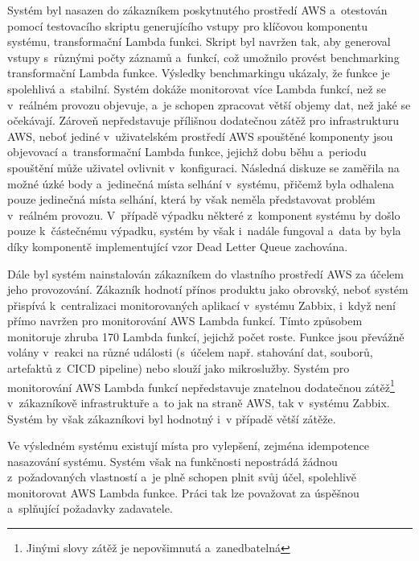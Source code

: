 \documentclass[czech, ing, kiv, he, iso690]{fasthesis}
\begin{document}
Systém byl nasazen do zákazníkem poskytnutého prostředí AWS a~otestován pomocí testovacího skriptu generujícího vstupy pro klíčovou komponentu systému, transformační Lambda funkci. Skript byl navržen tak, aby generoval vstupy s~různými počty záznamů a~funkcí, což umožnilo provést benchmarking transformační Lambda funkce. Výsledky benchmarkingu ukázaly, že funkce je spolehlivá a~stabilní. Systém dokáže monitorovat více Lambda funkcí, než se v~reálném provozu objevuje, a~je schopen zpracovat větší objemy dat, než jaké se očekávají. Zároveň nepředstavuje přílišnou dodatečnou zátěž pro infrastrukturu AWS, neboť jediné v~uživatelském prostředí AWS spouštěné komponenty jsou objevovací a~transformační Lambda funkce, jejichž dobu běhu a~periodu spouštění může uživatel ovlivnit v~konfiguraci. Následná diskuze se zaměřila na možné úzké body a~jedinečná místa selhání v~systému, přičemž byla odhalena pouze jedinečná místa selhání, která by však neměla představovat problém v~reálném provozu. V~případě výpadku některé z~komponent systému by došlo pouze k~částečnému výpadku, systém by však i~nadále fungoval a~data by byla díky komponentě implementující vzor Dead Letter Queue zachována.

Dále byl systém nainstalován zákazníkem do vlastního prostředí AWS za účelem jeho provozování. Zákazník hodnotí přínos produktu jako obrovský, neboť systém přispívá k~centralizaci monitorovaných aplikací v~systému Zabbix, i~když není přímo navržen pro monitorování AWS Lambda funkcí. Tímto způsobem monitoruje zhruba 170 Lambda funkcí, jejichž počet roste. Funkce jsou převážně volány v~reakci na různé události (s~účelem např. stahování dat, souborů, artefaktů z~CICD pipeline) nebo slouží jako mikroslužby. Systém pro monitorování AWS Lambda funkcí nepředstavuje znatelnou dodatečnou zátěž\footnote{Jinými slovy zátěž je nepovšimnutá a~zanedbatelná} v~zákazníkově infrastruktuře a~to jak na straně AWS, tak v~systému Zabbix. Systém by však zákazníkovi byl hodnotný i~v případě větší zátěže.

Ve výsledném systému existují místa pro vylepšení, zejména idempotence nasazování systému. Systém však na funkčnosti nepostrádá žádnou z~požadovaných vlastností a~je plně schopen plnit svůj účel, spolehlivě monitorovat AWS Lambda funkce. Práci tak lze považovat za úspěšnou a~splňující požadavky zadavatele.

%
%
%
%
\end{document}
